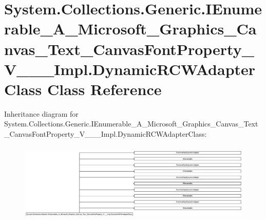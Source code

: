\hypertarget{class_system_1_1_collections_1_1_generic_1_1_i_enumerable___a___microsoft___graphics___canvas___7c9d61948fe18141fb3eecbebdb70a84}{}\section{System.\+Collections.\+Generic.\+I\+Enumerable\+\_\+\+A\+\_\+\+Microsoft\+\_\+\+Graphics\+\_\+\+Canvas\+\_\+\+Text\+\_\+\+Canvas\+Font\+Property\+\_\+\+V\+\_\+\+\_\+\+\_\+\+Impl.\+Dynamic\+R\+C\+W\+Adapter\+Class Class Reference}
\label{class_system_1_1_collections_1_1_generic_1_1_i_enumerable___a___microsoft___graphics___canvas___7c9d61948fe18141fb3eecbebdb70a84}
Inheritance diagram for System.\+Collections.\+Generic.\+I\+Enumerable\+\_\+\+A\+\_\+\+Microsoft\+\_\+\+Graphics\+\_\+\+Canvas\+\_\+\+Text\+\_\+\+Canvas\+Font\+Property\+\_\+\+V\+\_\+\+\_\+\+\_\+\+Impl.\+Dynamic\+R\+C\+W\+Adapter\+Class\+:\begin{figure}[H]
\begin{center}
\leavevmode
\includegraphics[height=3.835616cm]{class_system_1_1_collections_1_1_generic_1_1_i_enumerable___a___microsoft___graphics___canvas___7c9d61948fe18141fb3eecbebdb70a84}
\end{center}
\end{figure}
